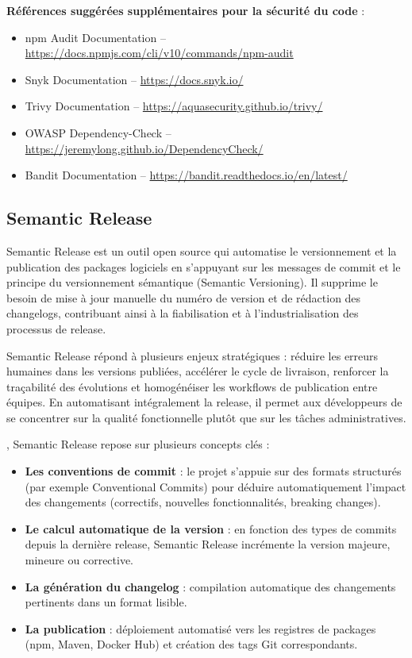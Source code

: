 \textbf{Références suggérées supplémentaires pour la sécurité du code} :
\begin{itemize}
	\item npm Audit Documentation – \url{https://docs.npmjs.com/cli/v10/commands/npm-audit}
	\item Snyk Documentation – \url{https://docs.snyk.io/}
	\item Trivy Documentation – \url{https://aquasecurity.github.io/trivy/}
	\item OWASP Dependency-Check – \url{https://jeremylong.github.io/DependencyCheck/}
	\item Bandit Documentation – \url{https://bandit.readthedocs.io/en/latest/}
\end{itemize}

\subsection{Semantic Release}

Semantic Release est un outil open source qui automatise le versionnement et la publication des packages logiciels en s’appuyant sur les messages de commit et le principe du versionnement sémantique (Semantic Versioning). Il supprime le besoin de mise à jour manuelle du numéro de version et de rédaction des changelogs, contribuant ainsi à la fiabilisation et à l’industrialisation des processus de release.

Semantic Release répond à plusieurs enjeux stratégiques  : réduire les erreurs humaines dans les versions publiées, accélérer le cycle de livraison, renforcer la traçabilité des évolutions et homogénéiser les workflows de publication entre équipes. En automatisant intégralement la release, il permet aux développeurs de se concentrer sur la qualité fonctionnelle plutôt que sur les tâches administratives.

, Semantic Release repose sur plusieurs concepts clés  :
\begin{itemize}
	\item \textbf{Les conventions de commit}  : le projet s’appuie sur des formats structurés (par exemple Conventional Commits) pour déduire automatiquement l’impact des changements (correctifs, nouvelles fonctionnalités, breaking changes).
	\item \textbf{Le calcul automatique de la version}  : en fonction des types de commits depuis la dernière release, Semantic Release incrémente la version majeure, mineure ou corrective.
	\item \textbf{La génération du changelog}  : compilation automatique des changements pertinents dans un format lisible.
	\item \textbf{La publication}  : déploiement automatisé vers les registres de packages (npm, Maven, Docker Hub) et création des tags Git correspondants.
\end{itemize}

